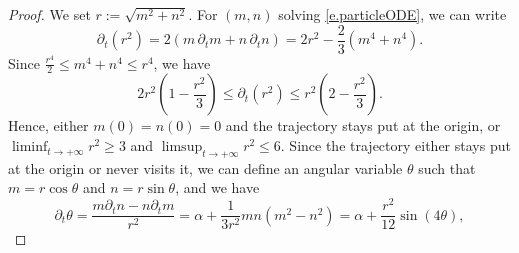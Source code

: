 \documentclass[11pt]{amsart}
\theoremstyle{remark}
\theoremstyle{definition}
\numberwithin{equation}{section}
\numberwithin{proposition}{section}
\renewcommand{\le}{\leqslant}
\renewcommand{\ge}{\geqslant}
\newcommand{\Ll}{\left}
\newcommand{\Rr}{\right}
\newcommand{\dr}{\partial}
\newcommand{\1}{\mathbf{1}}
\newcommand{\al}{\alpha}
\begin{document}
\begin{proof}
We set $r := \sqrt{m^2 + n^2}$. For $(m,n)$ solving \eqref{e.particleODE}, we can write
\begin{equation}  
\label{e.dr.r}
\dr_t (r^2)  = 2(m \, \dr_t{m} + n \, \dr_t{n}) = 2r^2 - \frac{2}{3}(m^4 + n^4).
\end{equation}
Since $\frac {r^4}{2} \le m^4 + n^4 \le r^4$, we have
\begin{equation*}  %
2r^2  \Ll( 1 - \frac {r^2} 3 \Rr) \le \dr_t (r^2) \le r^2  \Ll( 2 - \frac {r^2} 3 \Rr) .
\end{equation*}
Hence, either $m(0) = n(0) = 0$ and the trajectory stays put at the origin, or $\liminf_{t \to +\infty} r^2 \ge 3$ and $\limsup_{t \to +\infty} r^2 \le 6$. Since the trajectory either stays put at the origin or never visits it, we can define an angular variable $\theta$ such that $m = r \cos \theta$ and $n = r \sin \theta$, and we have
\begin{equation}  
\label{e.drt.theta}
\dr_t \theta = \frac{m \dr_t n - n \dr_t m}{r^2} = \al + \frac{1}{3r^2} mn(m^2 - n^2) = \al + \frac{r^2}{12} \sin(4\theta),
\end{equation}

\end{proof}
\end{document}

